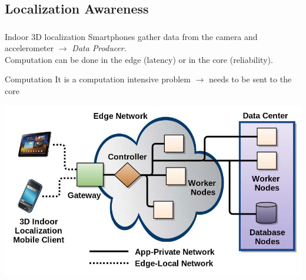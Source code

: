 \documentclass[utf8,xcolor=table, page number]{earlywinter}
\begin{document}
\subsection{Localization Awareness}
\begin{frame}
  \frametitle{\secname}
  \framesubtitle{\subsecname}

  \begin{exampleblock}{Indoor 3D localization}
    Smartphones gather data from the camera and accelerometer $\to$ \emph{Data Producer}.\\
    Computation can be done in the edge (latency) or in the core (reliability).
  \end{exampleblock}

  \begin{minipage}[l]{0.3\linewidth}
    \begin{exampleblock}{Computation}
      It is a computation intensive problem $\to$ needs to be sent to the core
    \end{exampleblock}
  \end{minipage}
  \begin{minipage}[l]{0.65\linewidth}
  \begin{center}
  \includegraphics[scale=0.2]{indoor}
  \end{center}
  \end{minipage}

\end{frame}
\end{document}
